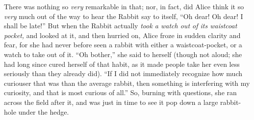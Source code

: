 There was nothing so \emph{very} remarkable in that; nor, in fact, did Alice think it so \emph{very} much out of the way to hear the Rabbit say to itself, “Oh dear! Oh dear! I shall be late!” But when the Rabbit actually \emph{took a watch out of its waistcoat pocket,} and looked at it, and then hurried on, Alice froze in sudden clarity and fear, for she had never before seen a rabbit with either a waistcoat-pocket, or a watch to take out of it. “Oh bother,” she said to herself (though not aloud; she had long since cured herself of that habit, as it made people take her even less seriously than they already did). “If I did not immediately recognize how much curiouser that was than the average rabbit, then something is interfering with my curiosity, and that is most curious of all.” So, burning with questions, she ran across the field after it, and was just in time to see it pop down a large rabbit-hole under the hedge.

